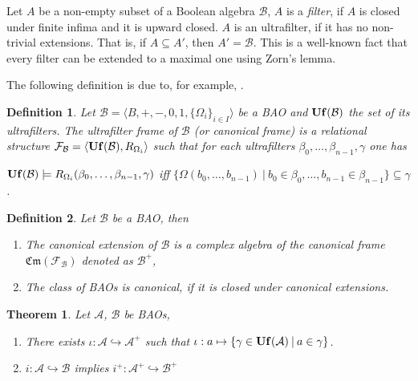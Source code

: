 \documentclass[a4paper]{article}
\theoremstyle{defin}
\newtheorem{defin}{Definition}
\theoremstyle{theorem}
\newtheorem{theorem}{Theorem}
\theoremstyle{prop}
\theoremstyle{lemma}
\theoremstyle{fact}
\theoremstyle{ex}
\theoremstyle{col}
\begin{document}
Let $A$ be a non-empty subset of a Boolean algebra $\mathcal{B}$, $A$ is a \emph{filter}, if $A$ is closed under finite infima and it is upward closed. $A$ is an ultrafilter, if it has no non-trivial extensions. That is, if $A \subseteq A'$, then $A' = \mathcal{B}$. This is a well-known fact that every filter can be extended to a maximal one using Zorn's lemma.

The following definition is due to, for example, \cite[Definition 5.40]{venema2010}.

\begin{defin}
  Let $\mathcal{B} = \langle B, +, -, 0, 1, \{ \Omega_i \}_{i \in I} \rangle$ be a BAO and ${\bf Uf}(\mathcal{B})$ the set of its ultrafilters. The ultrafilter frame of $\mathcal{B}$ (or canonical frame) is a relational structure $\mathcal{F}_{\mathcal{B}} = \langle {\bf Uf}(\mathcal{B}), R_{\Omega_i} \rangle$ such that for each ultrafilters $\beta_0, \dots, \beta_{n - 1}, \gamma$ one has
  \begin{center}
    ${\bf Uf}(\mathcal{B}) \models R_{\Omega_i}(\beta_0, \dots, \beta_{n - 1}, \gamma)$ iff $\{ \Omega(b_0, \dots, b_{n - 1}) \: | \: b_0 \in \beta_0, \dots, b_{n - 1} \in \beta_{n - 1}\} \subseteq \gamma$.
  \end{center}
\end{defin}

\begin{defin} Let $\mathcal{B}$ be a BAO, then

  \begin{enumerate}
    \item The canonical extension of $\mathcal{B}$ is a complex algebra of the canonical frame $\mathfrak{Cm}(\mathcal{F}_{\mathcal{B}})$ denoted as $\mathcal{B}^{+}$,
    \item The class of BAOs is canonical, if it is closed under canonical extensions.
  \end{enumerate}
\end{defin}

\begin{theorem} Let $\mathcal{A}$, $\mathcal{B}$ be BAOs,

\begin{enumerate}
  \item There exists $\iota : \mathcal{A} \hookrightarrow \mathcal{A}^{+}$ such that
  $\iota : a \mapsto \{ \gamma \in {\bf Uf}(\mathcal{A}) \: | \: a \in \gamma \}$.
  \item $i : \mathcal{A} \hookrightarrow \mathcal{B}$ implies
  $i^{+} : \mathcal{A}^{+} \hookrightarrow \mathcal{B}^{+}$
\end{enumerate}
\end{theorem}
\end{document}
